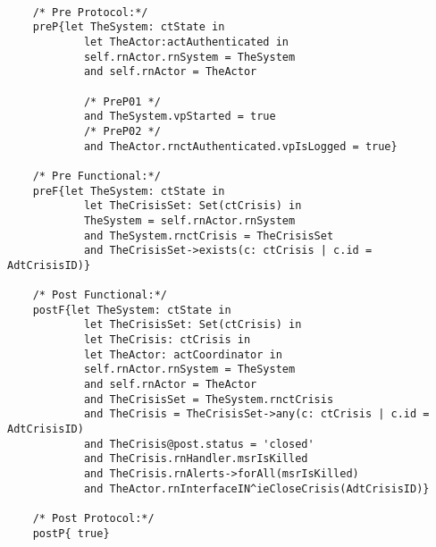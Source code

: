 	\scriptsize
	\vspace{0.5cm}
	\begin{lstlisting}[style=MessirStyle,firstnumber=auto,captionpos=b,caption={\msrmessir (MCL-oriented) specification of the operation \emph{oeCloseCrisis}.},label=OM-actCoordinator-oeCloseCrisis-MCL-LST]

	/* Pre Protocol:*/ 
	preP{let TheSystem: ctState in
	  		let TheActor:actAuthenticated in
	  		self.rnActor.rnSystem = TheSystem
	  		and self.rnActor = TheActor
	  
			/* PreP01 */
	  		and TheSystem.vpStarted = true
			/* PreP02 */
	  		and TheActor.rnctAuthenticated.vpIsLogged = true}
	
	/* Pre Functional:*/
	preF{let TheSystem: ctState in
			let TheCrisisSet: Set(ctCrisis) in
			TheSystem = self.rnActor.rnSystem
			and TheSystem.rnctCrisis = TheCrisisSet
			and TheCrisisSet->exists(c: ctCrisis | c.id = AdtCrisisID)}
	
	/* Post Functional:*/ 
	postF{let TheSystem: ctState in
			let TheCrisisSet: Set(ctCrisis) in
			let TheCrisis: ctCrisis in
			let TheActor: actCoordinator in
			self.rnActor.rnSystem = TheSystem
			and self.rnActor = TheActor
			and TheCrisisSet = TheSystem.rnctCrisis
			and TheCrisis = TheCrisisSet->any(c: ctCrisis | c.id = AdtCrisisID)
			and TheCrisis@post.status = 'closed'
			and TheCrisis.rnHandler.msrIsKilled
			and TheCrisis.rnAlerts->forAll(msrIsKilled)
			and TheActor.rnInterfaceIN^ieCloseCrisis(AdtCrisisID)}
	
	/* Post Protocol:*/ 
	postP{ true}
	
	\end{lstlisting}
	\normalsize 
	
	
	
	





